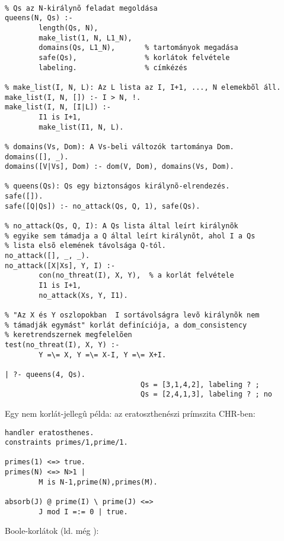 \begin{verbatim}

% Qs az N-királynõ feladat megoldása
queens(N, Qs) :-
        length(Qs, N), 
        make_list(1, N, L1_N), 
        domains(Qs, L1_N),       % tartományok megadása
        safe(Qs),                % korlátok felvétele
        labeling.                % címkézés

% make_list(I, N, L): Az L lista az I, I+1, ..., N elemekbõl áll.
make_list(I, N, []) :- I > N, !.
make_list(I, N, [I|L]) :-
        I1 is I+1,
        make_list(I1, N, L).

% domains(Vs, Dom): A Vs-beli változók tartománya Dom.
domains([], _).
domains([V|Vs], Dom) :- dom(V, Dom), domains(Vs, Dom).

% queens(Qs): Qs egy biztonságos királynõ-elrendezés.
safe([]).
safe([Q|Qs]) :- no_attack(Qs, Q, 1), safe(Qs).

% no_attack(Qs, Q, I): A Qs lista által leírt királynõk
% egyike sem támadja a Q által leírt királynõt, ahol I a Qs
% lista elsõ elemének távolsága Q-tól.
no_attack([], _, _).
no_attack([X|Xs], Y, I) :-
        con(no_threat(I), X, Y),  % a korlát felvétele
        I1 is I+1, 
        no_attack(Xs, Y, I1).

% "Az X és Y oszlopokban  I sortávolságra levõ királynõk nem 
% támadják egymást" korlát definíciója, a dom_consistency 
% keretrendszernek megfelelõen
test(no_threat(I), X, Y) :-
        Y =\= X, Y =\= X-I, Y =\= X+I.

| ?- queens(4, Qs).
                                Qs = [3,1,4,2], labeling ? ;
                                Qs = [2,4,1,3], labeling ? ; no
\end{verbatim}

Egy nem korlát-jellegû példa: az eratoszthenészi prímszita CHR-ben:

\begin{verbatim}
handler eratosthenes.
constraints primes/1,prime/1.

primes(1) <=> true.
primes(N) <=> N>1 | 
        M is N-1,prime(N),primes(M). 

absorb(J) @ prime(I) \ prime(J) <=> 
        J mod I =:= 0 | true.
\end{verbatim}

Boole-korlátok (ld. még ):

